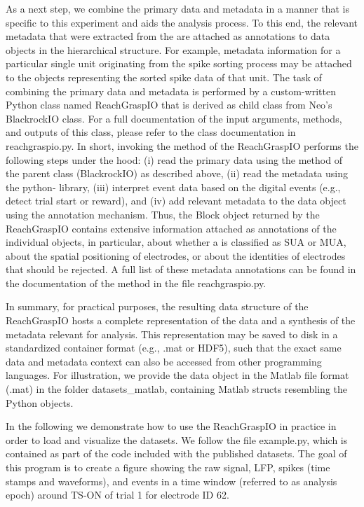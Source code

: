 {As a next step, we combine the primary data and metadata in a manner that is specific to this experiment and aids the analysis process. To this end, the relevant metadata that were extracted from the  are attached as annotations to data objects in the hierarchical  structure. For example, metadata information for a particular single unit originating from the spike sorting process may be attached to the  objects representing the sorted spike data of that unit. The task of combining the primary data and metadata is performed by a custom-written Python class named ReachGraspIO that is derived as child class from Neo's BlackrockIO class. For a full documentation of the input arguments, methods, and outputs of this class, please refer to the class documentation in reachgraspio.py. In short, invoking the  method of the ReachGraspIO performs the following steps under the hood: (i) read the primary data using the  method of the parent class (BlackrockIO) as described above, (ii) read the metadata using the python- library, (iii) interpret event data based on the digital events (e.g., detect trial start or reward), and (iv) add relevant metadata to the  data object using the annotation mechanism. Thus, the  Block object returned by the ReachGraspIO contains extensive information attached as annotations of the individual  objects, in particular, about whether a  is classified as SUA or MUA, about the spatial positioning of electrodes, or about the identities of electrodes that should be rejected. A full list of these metadata annotations can be found in the documentation of the  method in the file reachgraspio.py.

In summary, for practical purposes, the resulting data structure of the ReachGraspIO hosts a complete representation of the data and a synthesis of the metadata relevant for analysis. This representation may be saved to disk in a standardized container format (e.g., .mat or HDF5), such that the exact same data and metadata context can also be accessed from other programming languages. For illustration, we provide the data object in the Matlab file format (.mat) in the folder datasets\_matlab, containing Matlab structs resembling the Python  objects.

In the following we demonstrate how to use the ReachGraspIO in practice in order to load and visualize the datasets. We follow the file example.py, which is contained as part of the code included with the published datasets. The goal of this program is to create a figure showing the raw signal, LFP, spikes (time stamps and waveforms), and events in a time window (referred to as analysis epoch) around TS-ON of trial 1 for electrode ID 62. 

}
